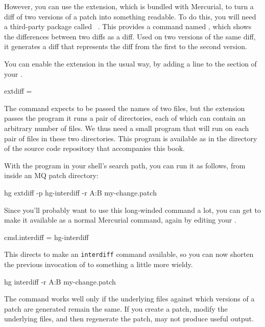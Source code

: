 However, you can use the  extension, which is bundled
with Mercurial, to turn a diff of two versions of a patch into
something readable.  To do this, you will need a third-party package
called ~\cite{web:patchutils}.  This provides a
command named , which shows the differences between
two diffs as a diff.  Used on two versions of the same diff, it
generates a diff that represents the diff from the first to the second
version.

You can enable the  extension in the usual way, by
adding a line to the  section of your \hgrc.
\begin{codesample2}
  [extensions]
  extdiff =
\end{codesample2}
The  command expects to be passed the names of two
files, but the  extension passes the program it runs a
pair of directories, each of which can contain an arbitrary number of
files.  We thus need a small program that will run 
on each pair of files in these two directories.  This program is
available as  in the 
directory of the source code repository that accompanies this book.

With the  program in your shell's search path,
you can run it as follows, from inside an MQ patch directory:
\begin{codesample2}
  hg extdiff -p hg-interdiff -r A:B my-change.patch
\end{codesample2}
Since you'll probably want to use this long-winded command a lot, you
can get  to make it available as a normal Mercurial
command, again by editing your \hgrc.
\begin{codesample2}
  [extdiff]
  cmd.interdiff = hg-interdiff
\end{codesample2}
This directs  to make an \texttt{interdiff} command
available, so you can now shorten the previous invocation of
 to something a little more wieldy.
\begin{codesample2}
  hg interdiff -r A:B my-change.patch
\end{codesample2}

\begin{note}
  The  command works well only if the underlying
  files against which versions of a patch are generated remain the
  same.  If you create a patch, modify the underlying files, and then
  regenerate the patch,  may not produce useful
  output.
\end{note}

